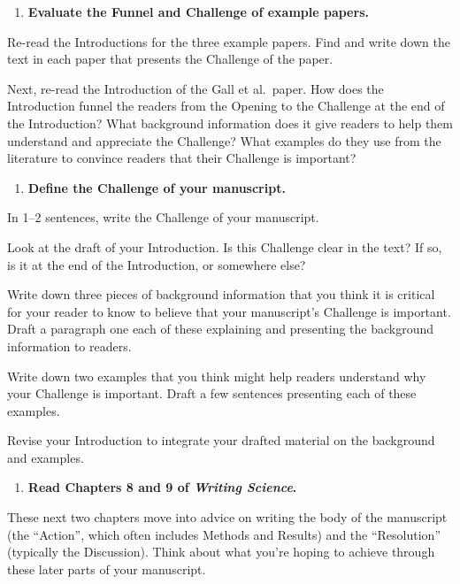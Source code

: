\documentclass[]{tufte-book}
\providecommand{\tightlist}{%
  \setlength{\itemsep}{0pt}\setlength{\parskip}{0pt}}
\begin{document}
\begin{enumerate}
\def\labelenumi{\arabic{enumi}.}
\setcounter{enumi}{8}
\tightlist
\item
  \textbf{Evaluate the Funnel and Challenge of example papers.}
\end{enumerate}

Re-read the Introductions for the three example papers. Find and write down the
text in each paper that presents the Challenge of the paper.

Next, re-read the Introduction of the Gall et al.~paper. How does the
Introduction funnel the readers from the Opening to the Challenge at the end of
the Introduction? What background information does it give readers to help them
understand and appreciate the Challenge? What examples do they use from the
literature to convince readers that their Challenge is important?

\begin{enumerate}
\def\labelenumi{\arabic{enumi}.}
\setcounter{enumi}{9}
\tightlist
\item
  \textbf{Define the Challenge of your manuscript.}
\end{enumerate}

In 1--2 sentences, write the Challenge of your manuscript.

Look at the draft of your Introduction. Is this Challenge clear in the text? If
so, is it at the end of the Introduction, or somewhere else?

Write down three pieces of background information that you think it is critical
for your reader to know to believe that your manuscript's Challenge is
important. Draft a paragraph one each of these explaining and presenting the
background information to readers.

Write down two examples that you think might help readers understand why your
Challenge is important. Draft a few sentences presenting each of these examples.

Revise your Introduction to integrate your drafted material on the background
and examples.

\begin{enumerate}
\def\labelenumi{\arabic{enumi}.}
\setcounter{enumi}{10}
\tightlist
\item
  \textbf{Read Chapters 8 and 9 of \emph{Writing Science}.}
\end{enumerate}

These next two chapters move into advice on writing the body of the manuscript
(the ``Action'', which often includes Methods and Results) and the ``Resolution''
(typically the Discussion). Think about what you're hoping to achieve through
these later parts of your manuscript.
\end{document}
